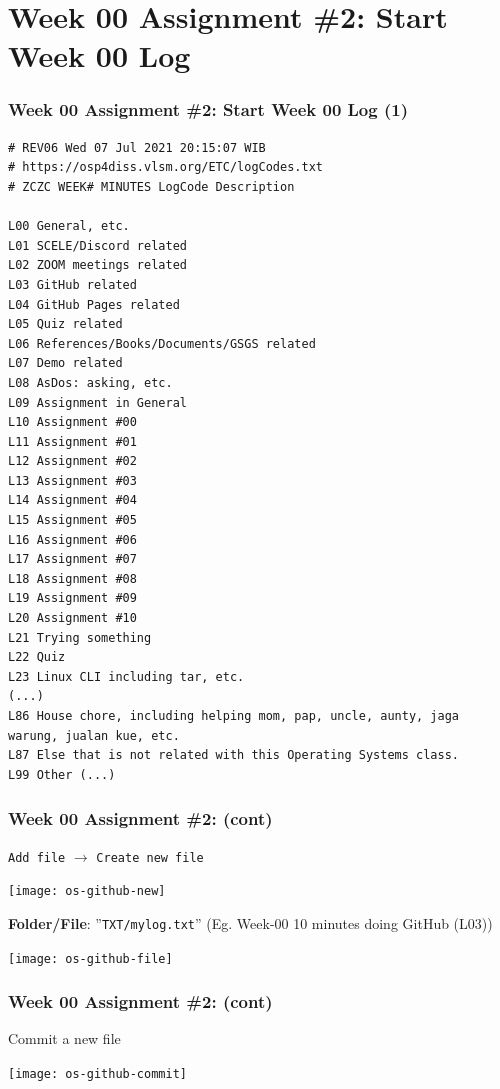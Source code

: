 \documentclass[xcolor=table, notheorems, hyperref={pdfpagelabels=false}]{beamer}
\begin{document}
\section{Week 00 Assignment \#2: Start Week 00 Log}
\begin{frame}[fragile]
\frametitle{Week 00 Assignment \#2: Start Week 00 Log (1)}
\begin{lstlisting}[basicstyle=\ttfamily\tiny]
# REV06 Wed 07 Jul 2021 20:15:07 WIB
# https://osp4diss.vlsm.org/ETC/logCodes.txt
# ZCZC WEEK# MINUTES LogCode Description

L00 General, etc.
L01 SCELE/Discord related
L02 ZOOM meetings related
L03 GitHub related
L04 GitHub Pages related
L05 Quiz related
L06 References/Books/Documents/GSGS related
L07 Demo related
L08 AsDos: asking, etc.
L09 Assignment in General
L10 Assignment #00
L11 Assignment #01
L12 Assignment #02
L13 Assignment #03
L14 Assignment #04
L15 Assignment #05
L16 Assignment #06
L17 Assignment #07
L18 Assignment #08
L19 Assignment #09
L20 Assignment #10
L21 Trying something
L22 Quiz
L23 Linux CLI including tar, etc.
(...)
L86 House chore, including helping mom, pap, uncle, aunty, jaga warung, jualan kue, etc.
L87 Else that is not related with this Operating Systems class.
L99 Other (...)

\end{lstlisting}
\end{frame}

\begin{frame}[fragile]
\frametitle{Week 00 Assignment \#2: (cont)}
\texttt{Add file} $\rightarrow$ \texttt{Create new file} 

      \texttt{[image: os-github-new]}

\textbf{Folder/File}: ''\texttt{TXT/mylog.txt}'' ({\tiny Eg. Week-00 10 minutes doing GitHub (L03)})

      \texttt{[image: os-github-file]}

\end{frame}

\begin{frame}[fragile]
\frametitle{Week 00 Assignment \#2: (cont)}
Commit a new file

      \texttt{[image: os-github-commit]}

\end{frame}
\end{document}
